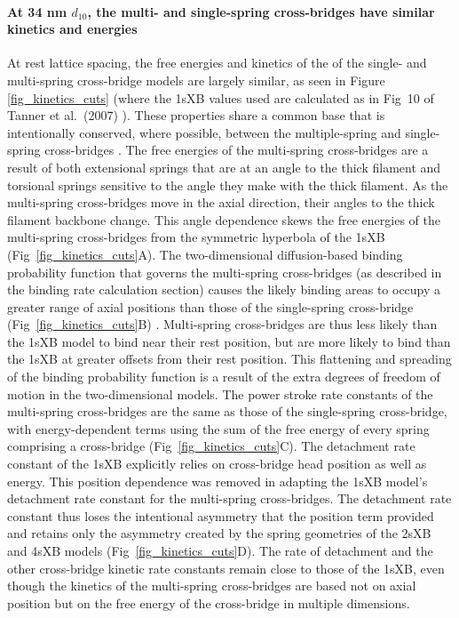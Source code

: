 \documentclass[10pt]{article}
\newcommand{\citep}[1]{\cite{#1}} %
\begin{document}
\paragraph{At 34 nm $d_{10}$, the multi- and single-spring cross-bridges have similar kinetics and energies} %
At rest lattice spacing, the free energies and kinetics of the of the single- and multi-spring cross-bridge models are largely similar, as seen in Figure \ref{fig_kinetics_cuts} (where the 1sXB values used are calculated as in Fig~10 of Tanner et al.~(2007) \citep{Tanner2007}).  
These properties share a common base that is intentionally conserved, where possible, between the multiple-spring and single-spring cross-bridges \citep{Pate1989}.
The free energies of the multi-spring cross-bridges are a result of both extensional springs that are at an angle to the thick filament and torsional springs sensitive to the angle they make with the thick filament. 
As the multi-spring cross-bridges move in the axial direction, their angles to the thick filament backbone change. 
This angle dependence skews the free energies of the multi-spring cross-bridges from the symmetric hyperbola of the 1sXB (Fig~\ref{fig_kinetics_cuts}A).
The two-dimensional diffusion-based binding probability function that governs the multi-spring cross-bridges (as described in the binding rate calculation section) causes the likely binding areas to occupy a greater range of axial positions than those of the single-spring cross-bridge (Fig~\ref{fig_kinetics_cuts}B) \citep{BergBook, DillBook}.
Multi-spring cross-bridges are thus less likely than the 1sXB model to bind near their rest position, but are more likely to bind than the 1sXB at greater offsets from their rest position. 
This flattening and spreading of the binding probability function is a result of the extra degrees of freedom of motion in the two-dimensional models. 
The power stroke rate constants of the multi-spring cross-bridges are the same as those of the single-spring cross-bridge, with energy-dependent terms using the sum of the free energy of every spring comprising a cross-bridge (Fig~\ref{fig_kinetics_cuts}C). 
The detachment rate constant of the 1sXB explicitly relies on cross-bridge head position as well as energy.
This position dependence was removed in adapting the 1sXB model's detachment rate constant for the multi-spring cross-bridges. 
The detachment rate constant thus loses the intentional asymmetry that the position term provided and retains only the asymmetry created by the spring geometries of the 2sXB and 4sXB models (Fig~\ref{fig_kinetics_cuts}D). 
The rate of detachment and the other cross-bridge kinetic rate constants remain close to those of the 1sXB, even though the kinetics of the multi-spring cross-bridges are based not on axial position but on the free energy of the cross-bridge in multiple dimensions. 
\end{document}
